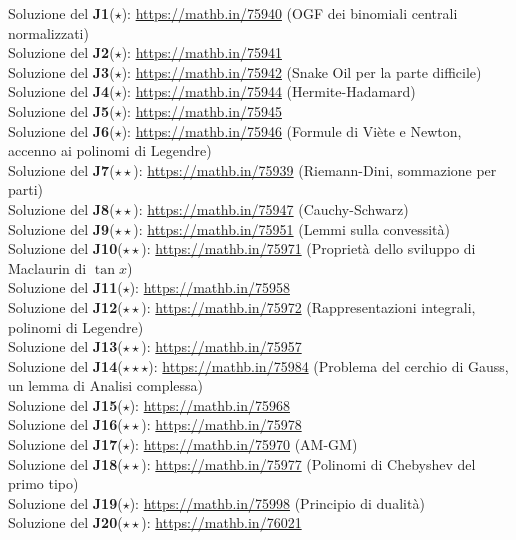 \documentclass[a4paper,twoside]{article}
\theoremstyle{definition}
\numberwithin{theorem}{section}
\begin{document}
Soluzione del \textbf{J1}($\star$): \url{https://mathb.in/75940} (OGF dei binomiali centrali normalizzati)\\
Soluzione del \textbf{J2}($\star$): \url{https://mathb.in/75941} \\
Soluzione del \textbf{J3}($\star$): \url{https://mathb.in/75942} (Snake Oil per la parte difficile)\\
Soluzione del \textbf{J4}($\star$): \url{https://mathb.in/75944} (Hermite-Hadamard)\\
Soluzione del \textbf{J5}($\star$): \url{https://mathb.in/75945} \\
Soluzione del \textbf{J6}($\star$): \url{https://mathb.in/75946} (Formule di Viète e Newton, accenno ai polinomi di Legendre)\\
Soluzione del \textbf{J7}($\star\star$): \url{https://mathb.in/75939} (Riemann-Dini, sommazione per parti) \\
Soluzione del \textbf{J8}($\star\star$): \url{https://mathb.in/75947} (Cauchy-Schwarz)\\
Soluzione del \textbf{J9}($\star\star$): \url{https://mathb.in/75951} (Lemmi sulla convessità) \\
Soluzione del \textbf{J10}($\star\star$): \url{https://mathb.in/75971} (Proprietà dello sviluppo di Maclaurin di $\tan x$)\\
Soluzione del \textbf{J11}($\star$): \url{https://mathb.in/75958} \\
Soluzione del \textbf{J12}($\star\star$): \url{https://mathb.in/75972} (Rappresentazioni integrali, polinomi di Legendre)\\
Soluzione del \textbf{J13}($\star\star$): \url{https://mathb.in/75957} \\
Soluzione del \textbf{J14}($\star\star\star$): \url{https://mathb.in/75984} (Problema del cerchio di Gauss, un lemma di Analisi complessa)\\
Soluzione del \textbf{J15}($\star$): \url{https://mathb.in/75968} \\
Soluzione del \textbf{J16}($\star\star$): \url{https://mathb.in/75978} \\
Soluzione del \textbf{J17}($\star$): \url{https://mathb.in/75970} (AM-GM)\\
Soluzione del \textbf{J18}($\star\star$): \url{https://mathb.in/75977} (Polinomi di Chebyshev del primo tipo)\\
Soluzione del \textbf{J19}($\star$): \url{https://mathb.in/75998} (Principio di dualità) \\
Soluzione del \textbf{J20}($\star\star$): \url{https://mathb.in/76021} \\
\end{document}
